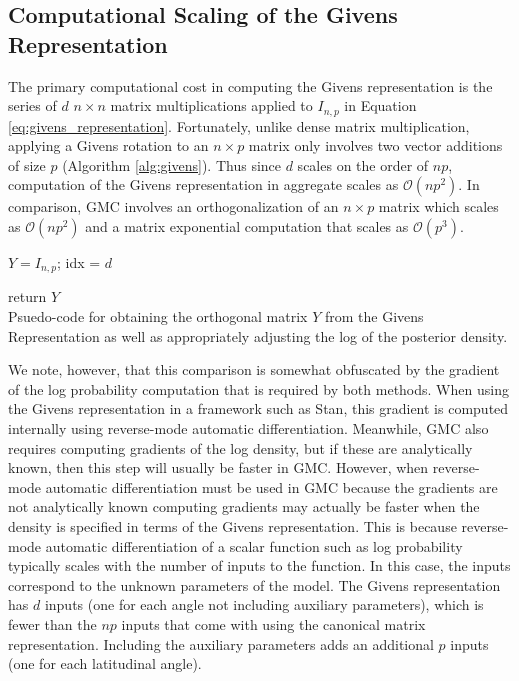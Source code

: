 \documentclass[ba]{imsart}
\numberwithin{equation}{section}
\theoremstyle{plain}
\begin{document}
\subsection{Computational Scaling of the Givens Representation}\label{scaling}
The primary computational cost in computing the Givens representation is the series of $d$ $n \times n$ matrix multiplications applied to $I_{n,p}$ in 
Equation \ref{eq:givens_representation}. Fortunately, unlike dense matrix multiplication, applying a Givens rotation to an $n \times p$ matrix only involves two vector additions of size $p$ (Algorithm \ref{alg:givens}). Thus since $d$ scales on the order of $np$, computation of the Givens representation in aggregate scales as $\mathcal{O}(np^2)$. In comparison, GMC involves an orthogonalization of an $n \times p$ matrix which scales as $\mathcal{O}(np^2)$ and a matrix exponential computation that scales as $\mathcal{O}(p^3)$.

\begin{algorithm}[h]
\SetAlgoLined
\KwIn{$\theta$}
$Y = I_{n,p}$;
 idx = $d$
 
return $Y$
\\
\caption{Psuedo-code for obtaining the orthogonal matrix $Y$ from the Givens Representation as well as appropriately adjusting the log of the posterior density.}
 \label{alg:givens}
\end{algorithm}

\noindent We note, however, that this comparison is somewhat obfuscated by the gradient of the log probability computation that is required by both methods. When using the Givens representation in a framework such as Stan, this gradient is computed internally using reverse-mode automatic differentiation. Meanwhile, GMC also requires computing gradients of the log density, but if these are analytically known, then this step will usually be faster in GMC. However, when reverse-mode automatic differentiation must be used in GMC because the gradients are not analytically known computing gradients may actually be faster when the density is specified in terms of the Givens representation. This is because reverse-mode automatic differentiation of a scalar function such as log probability typically scales with the number of inputs to the function. In this case, the inputs correspond to the unknown parameters of the model. The Givens representation has $d$ inputs (one for each angle not including auxiliary parameters), which is fewer than the $np$ inputs that come with using the canonical matrix representation. Including the auxiliary parameters adds an additional $p$ inputs (one for each latitudinal angle).
\end{document}
